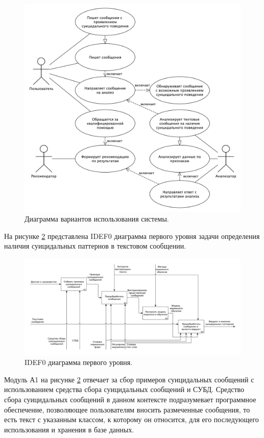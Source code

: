 \begin{figure}[H]
	\centering
	\includegraphics[width=\textwidth]{inc/useCase.pdf}
	\caption{ Диаграмма вариантов использования системы. }
	\label{img:useCase}
\end{figure}

На рисунке \ref{img:idef1} представлена IDEF0 диаграмма первого уровня задачи определения наличия суицидальных паттернов в текстовом сообщении.

\begin{figure}[H]
	\centering
	\includegraphics[width=\textwidth]{inc/A1.pdf}
	\caption{ IDEF0 диаграмма первого уровня. }
	\label{img:idef1}
\end{figure}

Модуль А1 на рисунке \ref{img:idef1} отвечает за сбор примеров суицидальных сообщений с использованием средства сбора суицидальных сообщений и СУБД. 
Средство сбора суицидальных сообщений в данном контексте подразумевает программное обеспечение, позволяющее пользователям вносить размеченные сообщения, то есть текст с указанным классом, к которому он относится, для его последующего использования и хранения в базе данных.

